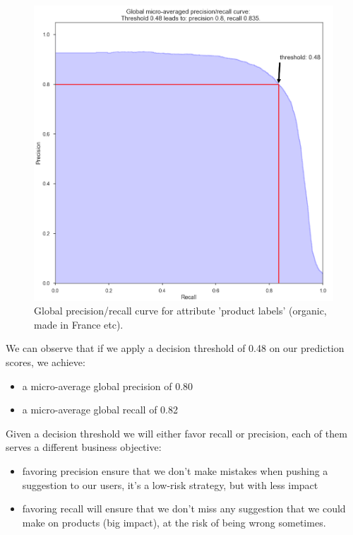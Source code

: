 \begin{figure}[H]
\centering
\includegraphics[scale=0.4]{./images/calibration/islabeledby_global_curve.png}
\caption{Global precision/recall curve for attribute 'product labels' (organic, made in France etc).}
\end{figure}

We can observe that if we apply a decision threshold of 0.48 on our prediction scores, we achieve:
\begin{itemize}
	\item a micro-average global precision of 0.80
	\item a micro-average global recall of 0.82
\end{itemize}

Given a decision threshold we will either favor recall or precision, each of them serves a different business objective:
\begin{itemize}
	\item favoring precision ensure that we don't make mistakes when pushing a suggestion to our users, it's a low-risk strategy, but with less impact
	\item favoring recall will ensure that we don't miss any suggestion that we could make on products (big impact), at the risk of being wrong sometimes.
\end{itemize}

